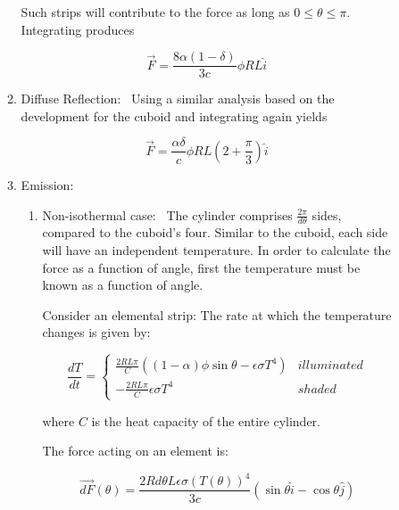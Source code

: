 \begin{description}
\begin{enumerate}
\begin{enumerate}
            Such strips will contribute to the force as long as
            $0 \leqslant \theta \leqslant \pi$.  Integrating produces

            \begin{equation}
              \vec {F}=\frac{8 \alpha (1-\delta)}{3 c}\phi RL \hat {i}
            \end{equation}
          \item{Diffuse Reflection:}\ \newline
            Using a similar analysis based on the development for the cuboid
            and integrating again yields

            \begin{equation}
              \vec {F}=\frac{ \alpha \delta}{c}\phi RL \left( 2+ \frac{\pi}{3}
              \right) \hat {i}
            \end{equation}
          \item{Emission:}\ \newline
           \begin{enumerate}
           \item{Non-isothermal case:}\ \newline
            The cylinder comprises $\frac{2 \pi}{d \theta}$ sides, compared to
            the cuboid's four.  Similar to the cuboid, each side will have an
            independent temperature.  In order to calculate the force as a
            function of angle, first the temperature must be known as a function
            of angle.

            Consider an elemental strip: The rate at which the
            temperature changes is given by:

             \begin{equation*}
              \frac{dT}{dt} =
              \begin{cases}
                \frac{2RL \pi}{C} \left((1-\alpha) \phi \sin
                \theta - \epsilon \sigma T^{4} \right) & illuminated \\
                -\frac{2RL \pi}{C} \epsilon \sigma T^{4}  & shaded
              \end{cases}
            \end{equation*}

            where $C$ is the heat capacity of the entire cylinder.

						The force acting on an element is:

            \begin{equation}
              \vec {dF}(\theta) = \frac {2R d\theta L \epsilon \sigma \left(
              T(\theta) \right) ^{4}}{3c} \left(\sin \theta \hat {i} -
              \cos \theta \hat {j} \right)
            \end{equation}


\end{enumerate}
\end{enumerate}
\end{enumerate}
\end{description}
